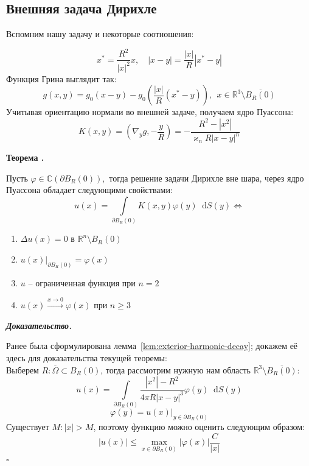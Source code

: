 \documentclass[11pt,a4paper]{report}
\numberwithin{equation}{section}
\numberwithin{figure}{chapter}
\numberwithin{table}{chapter}
\newif\ifinmathphysstatement
\newenvironment{mytheorem}[1][]{%
    \refstepcounter{theoremctr}%
    \inmathphysstatementtrue
    \begin{tcolorbox}[mathphysblock,colframe=theoremcolor,colback=theoremcolor!3,boxrule=0.8pt,#1]
    \textbf{\color{theoremcolor}Теорема \thetheoremctr.}\par\smallskip
}{%
    \end{tcolorbox}
    \inmathphysstatementfalse
}
\newenvironment{myproof}{%
    \begin{tcolorbox}[mathphysblock,colframe=proofcolor!65,colback=proofcolor!2,boxrule=0.5pt]
    \textit{\textbf{Доказательство.}}\par\smallskip
}{%
    \hfill$\square$
    \end{tcolorbox}
}
\newcommand{\R}{\mathbb{R}}
\newcommand{\C}{\mathbb{C}}
\newcommand{\p}{\partial}
\newcommand{\dd}{\mathop{}\!\mathrm{d}}
\newcommand{\skobka}[1]{\left( #1 \right)}
\renewcommand{\phi}{\varphi}
\begin{document}
\subsection{Внешняя задача Дирихле}
Вспомним нашу задачу и некоторые соотношения:
\begin{figure}[h!]
\centering
{}
\end{figure}

\[x^*=\dfrac{R^2}{|x|^2}x, \quad |x-y|=\dfrac{|x|}{R}|x^*-y|\]
Функция Грина выглядит так:
\[g(x,y)= g_0(x-y) - g_0\skobka{\dfrac{|x|}{R}(x^*-y)}, \ \ x\in \R^3\setminus \overline{B_R(0)}\]
Учитывая ориентацию нормали во внешней задаче, получаем ядро Пуассона:
\[
K(x,y) = \skobka{\nabla_yg,-\dfrac{y}{R}} = -\dfrac{R^2 - |x^2|}{\varkappa_nR|x-y|^n}
\]


\begin{mytheorem}
     Пусть $\phi \in \C(\p B_R(0)),$ тогда решение задачи Дирихле вне шара,  через ядро Пуассона обладает следующими свойствами:
    \[ u(x) = \int\limits_{\p B_R(0)}K(x,y)\phi(y)\dd S(y)\Leftrightarrow\]
    \begin{enumerate}
        \item $\Delta u(x) =0 $ в $\R^n\setminus B_R(0)$
        \item $\left.u(x)\right|_{\p B_R(0)}=\phi(x)$
        \item $u$ -- ограниченная функция при $n=2$
        \item $u(x)\xrightarrow{x\to 0}\phi(x)$ при $n\geq 3$
    \end{enumerate}
\end{mytheorem}

\begin{myproof}
\label{proof:exterior-harmonic-decay}
    Ранее была сформулирована лемма~\ref{lem:exterior-harmonic-decay}; докажем её здесь для доказательства текущей теоремы:
    \\ Выберем $R: \overline{\Omega}\subset B_R(0)$, тогда рассмотрим нужную нам область $\R^3\setminus \overline{B_R(0)}$:
    \[u(x) = \int\limits_{\p B_R(0)}\dfrac{|x^2|-R^2 }{4\pi R|x-y|^3}\phi(y)\dd S(y)\]
    \[\phi(y)=\left.u(x)\right|_{y\in \p B_R(0)} \]
    Существует $M: |x|>M$, поэтому функцию можно оценить следующим образом:
    \[|u(x)|\leq \max\limits_{x\in \partial B_R(0)}|\phi(x)|\dfrac{C}{|x|} \]
\end{myproof}
\end{document}
